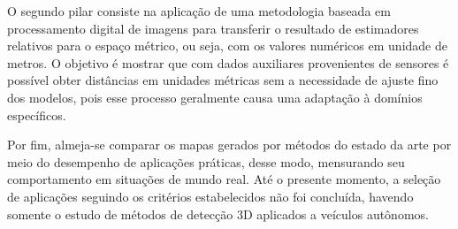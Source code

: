 O segundo pilar consiste na aplicação de uma metodologia baseada em processamento digital de imagens para transferir o resultado de estimadores relativos para o espaço métrico, ou seja, com os valores numéricos em unidade de metros. O objetivo é mostrar que com dados auxiliares provenientes de sensores é possível obter distâncias em unidades métricas sem a necessidade de ajuste fino dos modelos, pois esse processo geralmente causa uma adaptação à domínios específicos. 

Por fim, almeja-se comparar os mapas gerados por métodos do estado da arte por meio do desempenho de aplicações práticas, desse modo, mensurando seu comportamento em situações de mundo real. Até o presente momento, a seleção de aplicações seguindo os critérios estabelecidos não foi concluída, havendo somente o estudo de métodos de detecção 3D aplicados a veículos autônomos.